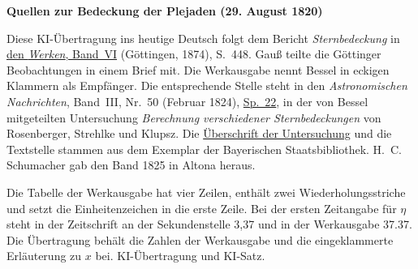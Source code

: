 \clearpage\thispagestyle{empty}
\begin{center}\textbf{Quellen zur Bedeckung der Plejaden (29. August 1820)}\end{center}
\noindent Diese KI-Übertragung ins heutige Deutsch folgt dem Bericht \textit{Sternbedeckung} in \href{https://gdz.sub.uni-goettingen.de/id/PPN236007467}{den \textit{Werken}, Band~VI} (Göttingen, 1874), S.~448. Gauß teilte die Göttinger Beobachtungen in einem Brief mit. Die Werkausgabe nennt Bessel in eckigen Klammern als Empfänger. Die entsprechende Stelle steht in den \textit{Astronomischen Nachrichten}, Band~III, Nr.~50 (Februar 1824), \href{https://api.digitale-sammlungen.de/iiif/image/v2/bsb10049428_00023/full/1800,/0/default.jpg}{Sp.~22}, in der von Bessel mitgeteilten Untersuchung \textit{Berechnung verschiedener Sternbedeckungen} von Rosenberger, Strehlke und Klupsz. Die \href{https://api.digitale-sammlungen.de/iiif/image/v2/bsb10049428_00021/full/1800,/0/default.jpg}{Überschrift der Untersuchung} und die Textstelle stammen aus dem Exemplar der Bayerischen Staatsbibliothek. H.~C. Schumacher gab den Band 1825 in Altona heraus.
\par\smallskip\noindent Die Tabelle der Werkausgabe hat vier Zeilen, enthält zwei Wiederholungsstriche und setzt die Einheitenzeichen in die erste Zeile. Bei der ersten Zeitangabe für $\eta$ steht in der Zeitschrift an der Sekundenstelle 3,37 und in der Werkausgabe 37.37. Die Übertragung behält die Zahlen der Werkausgabe und die eingeklammerte Erläuterung zu $x$ bei. KI-Übertragung und KI-Satz.
\clearpage
